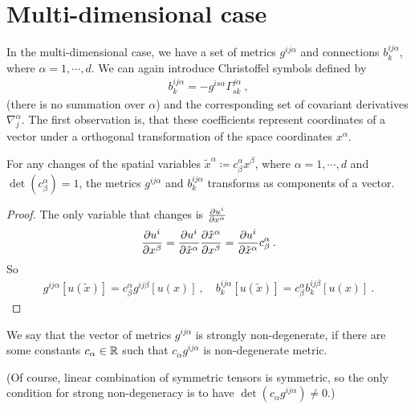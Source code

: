 
\section{Multi-dimensional case}

In the multi-dimensional case, we have a set of metrics $g^{ij \alpha}$ and connections $b^{ij \alpha}_k$, where $\alpha = 1 , \cdots, d$. We can again introduce Christoffel symbols defined by
\begin{align}
    b^{i j \alpha}_k = - g^{is \alpha} \Gamma^{j \alpha}_{sk}\:,
\end{align}
(there is no summation over $\alpha$) and the corresponding set of covariant derivatives $\nabla^{\alpha}_j$. The first observation is, that these coefficients represent coordinates of a vector under a orthogonal transformation of the space coordinates $x^\alpha$.
\begin{proposition}
    For any changes of the spatial variables $\tilde x^\alpha \coloneqq c^\alpha_\beta x^\beta$, where $\alpha = 1, \cdots, d$ and $\det (c^\alpha_\beta) = 1$, the metrics $g^{ij \alpha}$ and $b^{ij \alpha}_k$ transforms as components of a vector.
\end{proposition}

\begin{proof}
    The only variable that changes is $\frac{\partial u^i}{\partial x^\alpha}$
    \begin{align}
        \frac{\partial u^i}{\partial x^\beta} = \frac{\partial u^i}{\partial \tilde x^\alpha} \frac{\partial \tilde x^\alpha}{\partial x^\beta} = \frac{\partial u^i}{\partial \tilde x^\alpha} c^\alpha_\beta \:.
    \end{align}
    So
    \begin{align}
        g^{ij \alpha}[u(\tilde x)] = c^\alpha_\beta g^{ij \beta}[u(x)] \:, \quad b^{ij \alpha}_k [u(\tilde x)] = c^\alpha_\beta b^{ij \beta}_k [u(x)] \:.
    \end{align}
\end{proof}

\begin{definition}
    We say that the vector of metrics $g^{ij \alpha}$ is strongly non-degenerate, if there are some constants $c_\alpha \in \mathbb{R}$ such that $c_\alpha g^{ij \alpha}$ is non-degenerate metric.
\end{definition}
(Of course, linear combination of symmetric tensors is symmetric, so the only condition for strong non-degeneracy is to have $\det (c_\alpha g^{ij \alpha}) \neq 0$.)

